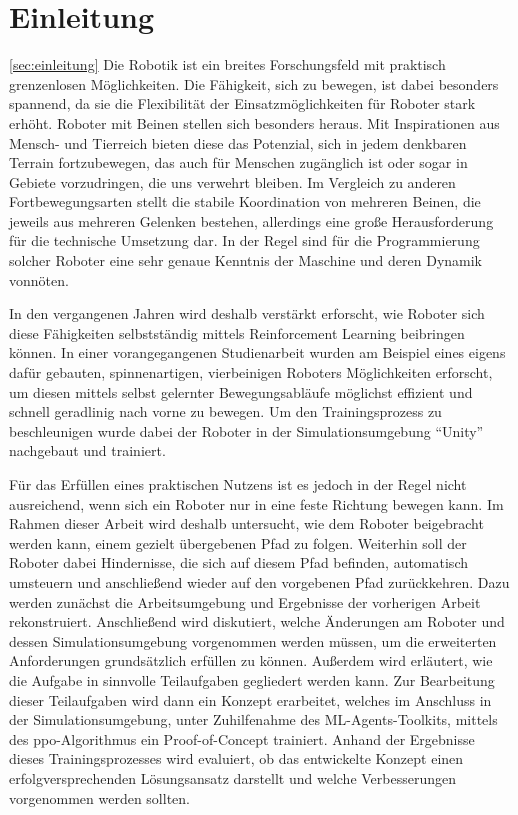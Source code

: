 \chapter{Einleitung}
\autoref{sec:einleitung}
Die Robotik ist ein breites Forschungsfeld mit praktisch grenzenlosen Möglichkeiten.
Die Fähigkeit, sich zu bewegen, ist dabei besonders spannend, da sie die Flexibilität der Einsatzmöglichkeiten für Roboter stark erhöht.
Roboter mit Beinen stellen sich besonders heraus.
Mit Inspirationen aus Mensch- und Tierreich bieten diese das Potenzial, sich in jedem denkbaren Terrain fortzubewegen, das auch für Menschen zugänglich ist oder sogar in Gebiete vorzudringen, die uns verwehrt bleiben.
Im Vergleich zu anderen Fortbewegungsarten stellt die stabile Koordination von mehreren Beinen, die jeweils aus mehreren Gelenken bestehen, allerdings eine große Herausforderung für die technische Umsetzung dar.
In der Regel sind für die Programmierung solcher Roboter eine sehr genaue Kenntnis der Maschine und deren Dynamik vonnöten.

In den vergangenen Jahren wird deshalb verstärkt erforscht, wie Roboter sich diese Fähigkeiten selbstständig mittels Reinforcement Learning beibringen können.
In einer vorangegangenen Studienarbeit wurden am Beispiel eines eigens dafür gebauten, spinnenartigen, vierbeinigen Roboters Möglichkeiten erforscht, um diesen mittels selbst gelernter Bewegungsabläufe möglichst effizient und schnell geradlinig nach vorne zu bewegen.
Um den Trainingsprozess zu beschleunigen wurde dabei der Roboter in der Simulationsumgebung \enquote{Unity} nachgebaut und trainiert.

Für das Erfüllen eines praktischen Nutzens ist es jedoch in der Regel nicht ausreichend, wenn sich ein Roboter nur in eine feste Richtung bewegen kann.
Im Rahmen dieser Arbeit wird deshalb untersucht, wie dem Roboter beigebracht werden kann, einem gezielt übergebenen Pfad zu folgen.
Weiterhin soll der Roboter dabei Hindernisse, die sich auf diesem Pfad befinden, automatisch umsteuern und anschließend wieder auf den vorgebenen Pfad zurückkehren. %
Dazu werden zunächst die Arbeitsumgebung und Ergebnisse der vorherigen Arbeit rekonstruiert.
Anschließend wird diskutiert, welche Änderungen am Roboter und dessen Simulationsumgebung vorgenommen werden müssen, um die erweiterten Anforderungen grundsätzlich erfüllen zu können.
Außerdem wird erläutert, wie die Aufgabe in sinnvolle Teilaufgaben gegliedert werden kann.
Zur Bearbeitung dieser Teilaufgaben wird dann ein Konzept erarbeitet, welches im Anschluss in der Simulationsumgebung, unter Zuhilfenahme des ML-Agents-Toolkits, mittels des \acl{ppo}-Algorithmus ein Proof-of-Concept trainiert.
Anhand der Ergebnisse dieses Trainingsprozesses wird evaluiert, ob das entwickelte Konzept einen erfolgversprechenden Lösungsansatz darstellt und welche Verbesserungen vorgenommen werden sollten.

